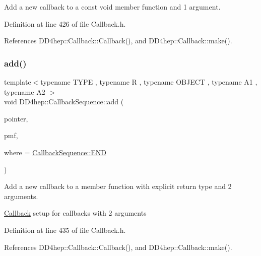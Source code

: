 Add a new callback to a const void member function and 1 argument. 



Definition at line 426 of file Callback.\+h.



References D\+D4hep\+::\+Callback\+::\+Callback(), and D\+D4hep\+::\+Callback\+::make().

\hypertarget{struct_d_d4hep_1_1_callback_sequence_ae918f983607662873095fd1dfe15eccb}{}\label{struct_d_d4hep_1_1_callback_sequence_ae918f983607662873095fd1dfe15eccb} 
\subsubsection{\texorpdfstring{add()}{add()}\hspace{0.1cm}{\footnotesize\ttfamily [10/13]}}
{\footnotesize\ttfamily template$<$typename T\+Y\+PE , typename R , typename O\+B\+J\+E\+CT , typename A1 , typename A2 $>$ \\
void D\+D4hep\+::\+Callback\+Sequence\+::add (\begin{DoxyParamCaption}\item[{T\+Y\+PE $\ast$}]{pointer,  }\item[{R(O\+B\+J\+E\+C\+T\+::$\ast$)(A1, A2)}]{pmf,  }\item[{\hyperlink{struct_d_d4hep_1_1_callback_sequence_a7753490247479633aed16a2376821ef7}{Location}}]{where = {\ttfamily \hyperlink{struct_d_d4hep_1_1_callback_sequence_a7753490247479633aed16a2376821ef7ac39eeb1bcfc1c235ab1d0d9315c310ac}{Callback\+Sequence\+::\+E\+ND}} }\end{DoxyParamCaption})\hspace{0.3cm}{\ttfamily [inline]}}



Add a new callback to a member function with explicit return type and 2 arguments. 

\hyperlink{class_d_d4hep_1_1_callback}{Callback} setup for callbacks with 2 arguments 

Definition at line 435 of file Callback.\+h.



References D\+D4hep\+::\+Callback\+::\+Callback(), and D\+D4hep\+::\+Callback\+::make().

\hypertarget{struct_d_d4hep_1_1_callback_sequence_a6a46a8fe88bd371fc3f643afa77d99fc}{}\label{struct_d_d4hep_1_1_callback_sequence_a6a46a8fe88bd371fc3f643afa77d99fc} 
